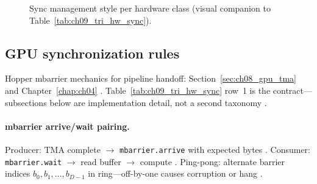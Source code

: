 \begin{figure}[t]
\centering
{}
\caption{Sync management style per hardware class (visual companion to Table~\ref{tab:ch09_tri_hw_sync}).}
\label{fig:ch09_tri_hw_sync}
\end{figure}

\subsection{GPU synchronization rules}
Hopper mbarrier mechanics for pipeline handoff: Section~\ref{sec:ch08_gpu_tma} and Chapter~\ref{chap:ch04} \citep{semianalysis2024tma,nvidia2022hopper,shah2024flashattention3}.
Table~\ref{tab:ch09_tri_hw_sync} row~1 is the contract---subsections below are implementation detail, not a second taxonomy \citep{yirage2026,patel2025llminference}.

\paragraph{mbarrier arrive/wait pairing.}
Producer: TMA complete $\rightarrow$ \texttt{mbarrier.arrive} with expected bytes \citep{semianalysis2024tma,shah2024flashattention3}.
Consumer: \texttt{mbarrier.wait} $\rightarrow$ read buffer $\rightarrow$ compute \citep{nvidia2022hopper,yirage2026}.
Ping-pong: alternate barrier indices $b_0, b_1, \ldots, b_{D-1}$ in ring---off-by-one causes corruption or hang \citep{dao2022flashattention,chen2020compilerbasedhardw}.

